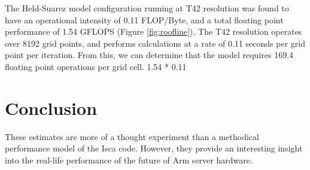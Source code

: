 \documentclass[a4paper,11pt]{report}
\begin{document}
The Held-Suarez model configuration running at T42 resolution was found to have an operational intensity of 0.11 FLOP/Byte, and a total floating point performance of 1.54 GFLOPS (Figure \ref{fig:roofline}). The T42 resolution operates over 8192 grid points, and performs calculations at a rate of 0.11 seconds per grid point per iteration. From this, we can determine that the model requires 169.4 floating point operations per grid cell. 1.54 * 0.11

\section{Conclusion}
These estimates are more of a thought experiment than a methodical performance model of the Isca code. However, they provide an interesting insight into the real-life performance of the future of Arm server hardware. 






%
%
%
%
\end{document}
